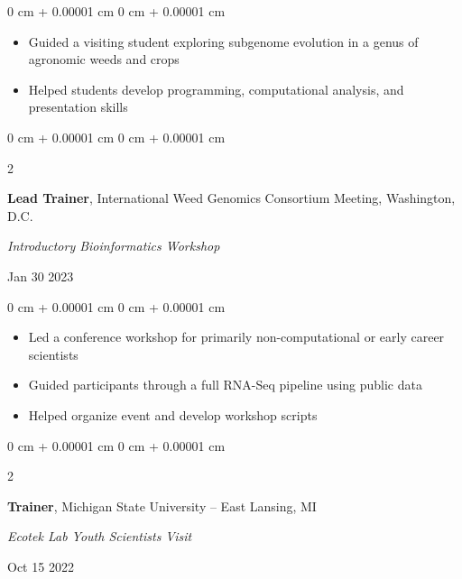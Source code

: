 \documentclass[10pt, letterpaper]{article}
\newenvironment{highlights}{
    \begin{itemize}[
        topsep=0.10 cm,
        parsep=0.10 cm,
        partopsep=0pt,
        itemsep=0pt,
        leftmargin=0 cm + 10pt
    ]
}{
    \end{itemize}
} %
\newenvironment{onecolentry}{
    \begin{adjustwidth}{
        0 cm + 0.00001 cm
    }{
        0 cm + 0.00001 cm
    }
}{
    \end{adjustwidth}
} %
\newenvironment{twocolentry}[2][]{
    \onecolentry
    \def\secondColumn{#2}
    \setcolumnwidth{\fill, 4.5 cm}
    \begin{paracol}{2}
}{
    \switchcolumn \raggedleft \secondColumn
    \end{paracol}
    \endonecolentry
} %
\begin{document}
        \vspace{0.10 cm}
        
        \begin{onecolentry}
            \begin{highlights}
                \item Guided a visiting student exploring subgenome evolution in a genus of agronomic weeds and crops
                \item Helped students develop programming, computational analysis, and presentation skills
            \end{highlights}
        \end{onecolentry}
        

        \vspace{0.2 cm}


        \begin{samepage} 
            \begin{twocolentry}{
                Jan 30 2023
                }
                \textbf{Lead Trainer}, International Weed Genomics Consortium Meeting, Washington, D.C.
                
                \vspace{0.05 cm}

                \textit{Introductory Bioinformatics Workshop}
            \end{twocolentry}
        \end{samepage}
        
        \begin{onecolentry}
            \begin{highlights}
                \item Led a conference workshop for primarily non-computational or early career scientists
                \item Guided participants through a full RNA-Seq pipeline using public data
                \item Helped organize event and develop workshop scripts               
            \end{highlights}
        \end{onecolentry}

        \vspace{0.2 cm}


        \begin{samepage} 
            \begin{twocolentry}{
                Oct 15 2022
                }
                \textbf{Trainer}, Michigan State University -- East Lansing, MI
                
                \vspace{0.05 cm}

                \textit{Ecotek Lab Youth Scientists Visit}
            \end{twocolentry}
        \end{samepage}
        
\end{document}
